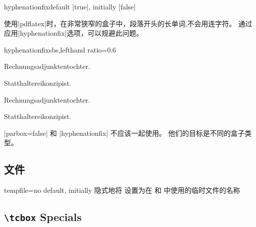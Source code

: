 \begin{docTcbKey}{hyphenationfix}{}{default |true|, initially |false|}

使用|pdflatex|时，在非常狭窄的盒子中，段落开头的长单词,不会用连字符。%
通过应用|hyphenationfix|选项，可以规避此问题。
\begin{exdispExample*}{hyphenationfix}{sbs,lefthand ratio=0.6}

\begin{tcolorbox}
Rechnungsadjunktentochter.\par
Statthaltereikonzipist.
\end{tcolorbox}

\begin{tcolorbox}[hyphenationfix]
Rechnungsadjunktentochter.\par
Statthaltereikonzipist.
\end{tcolorbox}
\end{exdispExample*}

\smallskip
\begin{marker}

|parbox=false| 和 |hyphenationfix| 不应该一起使用。%
他们的目标是不同的盒子类型。%
\end{marker}
\end{docTcbKey}


\subsection{文件}
\begin{docTcbKey}{tempfile}{=}{no default, initially }
隐式地将   设置为在  和  中使用的临时文件的名称
\end{docTcbKey}

\subsection{\texttt{\textbackslash tcbox} Specials}

